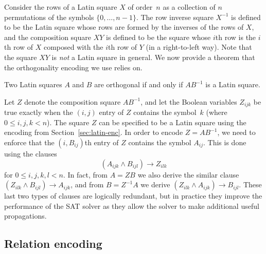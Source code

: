 \documentclass[runningheads]{llncs}
\newcommand{\limp}{\mathbin\rightarrow}
\begin{document}
Consider the rows of a Latin square $X$ of order~$n$ as a collection of $n$ permutations of
the symbols $\{0,\dotsc,n-1\}$.  The row inverse square $X^{-1}$ is defined to be the Latin square whose rows are formed
by the inverses of the rows of $X$, and the composition square $XY$ is defined to be the square whose $i$th
row is the $i$th row of $X$ composed with the $i$th row of $Y$ (in a right-to-left way).
Note that the square $XY$ is \emph{not} a Latin square in general.
We now provide a theorem that the orthogonality encoding we use relies on.
\begin{theorem}
Two Latin squares $A$ and $B$ are orthogonal if and only if\/ $AB^{-1}$ is a Latin square.
\end{theorem}
Let $Z$ denote the composition square $AB^{-1}$, and let the Boolean variables
$Z_{ijk}$ be true exactly when the $(i,j)$ entry of $Z$ contains the symbol~$k$
(where $0\leq i,j,k<n$).  The square $Z$ can be specified to be a Latin square using the encoding
from Section~\ref{sec:latin-enc}\@.  In order to encode $Z=AB^{-1}$, we need to enforce
that the $(i,B_{ij})$th entry of $Z$ contains the symbol $A_{ij}$.  This is done using the clauses
\begin{equation} (A_{ijk}\land B_{ijl})\limp Z_{ilk} \end{equation}
for $0\leq i,j,k,l<n$.  In fact, from $A=ZB$ we also derive the similar clause
$(Z_{ilk}\land B_{ijl})\limp A_{ijk}$, and from $B=Z^{-1}A$ we derive
$(Z_{ilk}\land A_{ijk})\limp B_{ijl}$.
These last two types of clauses are logically redundant, but in practice
they improve the performance of the SAT solver as they allow the solver to make
additional useful propagations.

\subsection{Relation encoding}\label{sec:relation-enc}
\end{document}
